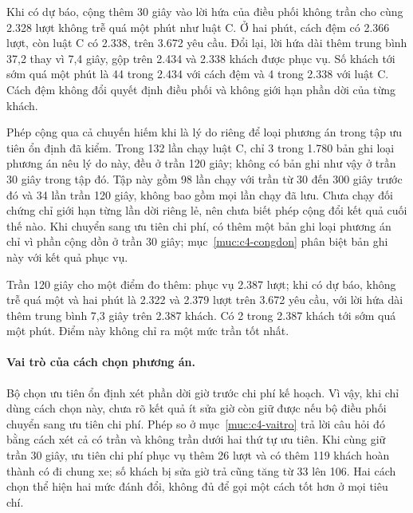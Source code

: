 Khi có dự báo, cộng thêm 30 giây vào lời hứa của điều phối không trần cho cùng 2.328 lượt không trễ quá
một phút như luật C. Ở hai phút, cách đệm có 2.366 lượt, còn luật C có 2.338, trên 3.672 yêu cầu.
Đổi lại, lời hứa dài thêm trung bình 37,2 thay vì 7,4 giây, gộp trên 2.434 và 2.338 khách được phục vụ.
Số khách tới sớm quá một phút là 44 trong 2.434 với cách đệm và 4 trong 2.338 với luật C.
Cách đệm không đổi quyết định điều phối và không giới hạn phần dời của từng khách.

Phép cộng qua cả chuyến hiếm khi là lý do riêng để loại phương án trong tập ưu tiên ổn định đã kiểm. Trong 132 lần chạy
luật C, chỉ 3 trong 1.780 bản ghi loại phương án nêu lý do này, đều ở trần 120 giây; không có bản ghi
như vậy ở trần 30 giây trong tập đó. Tập này gồm 98 lần chạy với trần từ 30 đến 300 giây trước đó và 34 lần trần 120 giây, không
bao gồm mọi lần chạy đã lưu. Chưa chạy đối chứng chỉ giới hạn từng lần dời riêng lẻ, nên chưa biết
phép cộng đổi kết quả cuối thế nào. Khi chuyển sang ưu tiên chi phí, có thêm một bản ghi loại phương án chỉ
vì phần cộng dồn ở trần 30 giây; mục~\ref{muc:c4-congdon} phân biệt bản ghi này với kết quả phục vụ.

Trần 120 giây cho một điểm đo thêm: phục vụ 2.387 lượt; khi có dự báo, không trễ quá một và hai phút là
2.322 và 2.379 lượt trên 3.672 yêu cầu, với lời hứa dài thêm trung bình 7,3 giây trên 2.387 khách.
Có 2 trong 2.387 khách tới sớm quá một phút. Điểm này không chỉ ra một mức trần tốt nhất.

\paragraph{Vai trò của cách chọn phương án.}
Bộ chọn ưu tiên ổn định xét phần dời giờ trước chi phí kế hoạch. Vì vậy, khi chỉ dùng cách chọn này, chưa rõ kết
quả ít sửa giờ còn giữ được nếu bộ điều phối chuyển sang ưu tiên chi phí. Phép so ở mục~\ref{muc:c4-vaitro} trả
lời câu hỏi đó bằng cách xét cả có trần và không trần dưới hai thứ tự ưu tiên. Khi cùng giữ trần 30 giây, ưu tiên
chi phí phục vụ thêm 26 lượt và có thêm 119 khách hoàn thành có đi chung xe; số khách bị sửa giờ trả cũng tăng từ
33 lên 106. Hai cách chọn thể hiện hai mức đánh đổi, không đủ để gọi một cách tốt hơn ở mọi tiêu chí.

